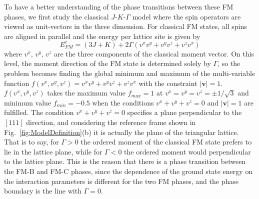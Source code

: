 \documentclass[aps,prb,reprint,amsfonts,amsmath,amssymb,showpacs,groupedaddress,superscriptaddress]{revtex4-1}
\begin{document}
To have a better understanding of the phase transitions between these FM phases, we first study the classical $J$-$K$-$\Gamma$ model where the spin operators are viewed as unit-vectors in the three dimension. For classical FM states, all spins are aligned in parallel and the energy per lattice site is given by
\begin{equation}
    E_{FM}^{c} = (3J + K) + 2 \Gamma (v^x v^y + v^y v^z + v^z v^x) \label{eq:EcFM}
\end{equation}
where $v^x$, $v^y$, $v^z$ are the three components of the classical moment vector. On this level, the moment direction of the FM state is determined solely by $\Gamma$, so the problem becomes finding the global minimum and maximum of the multi-variable function $f(v^x, v^y, v^z) = v^x v^y + v^y v^z + v^z v^x$ with the constraint $|\bm{v}| = 1$. $f(v^x, v^y, v^z)$ takes the maximum value $f_{max}=1$ at $v^x=v^y=v^z=\pm 1/\sqrt{3}$ and minimum value $f_{min}=-0.5$ when the conditions $v^x + v^y + v^z = 0$ and $|\bm{v}| = 1$ are fulfilled. The condition $v^x + v^y + v^z = 0$ specifies a plane perpendicular to the $[111]$ direction, and considering the reference frame shown in Fig.~\ref{fig:ModelDefinition}(b) it is actually the plane of the triangular lattice. That is to say, for $\Gamma > 0$ the ordered moment of the classical FM state prefers to lie in the lattice plane, while for $\Gamma<0$ the ordered moment would perpendicular to the lattice plane. This is the reason that there is a phase transition between the FM-B and FM-C phases, since the dependence of the ground state energy on the interaction parameters is different for the two FM phases, and the phase boundary is the line with $\Gamma=0$.
\end{document}
